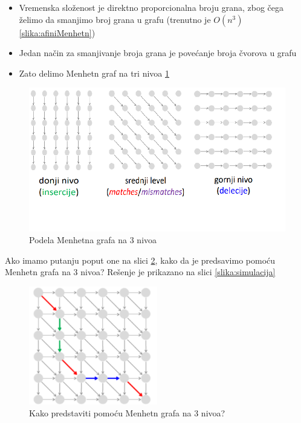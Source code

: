 \begin{itemize}
    \item Vremenska složenost je direktno proporcionalna broju grana, zbog čega želimo da smanjimo broj grana u grafu (trenutno je
$O(n^3)$ \ref{slika:afiniMenhetn})
\item Jedan način za smanjivanje broja grana je povećanje broja čvorova u grafu
\item Zato delimo Menhetn graf na tri nivoa \ref{slika:triNivoa}
\end{itemize}


\begin{figure}[]
\centering
\includegraphics[width=\textwidth]{poglavlja/5/slike/triNivoa.png}
\caption{Podela Menhetna grafa na 3 nivoa}
\label{slika:triNivoa}
\end{figure}

Ako imamo putanju poput one na slici \ref{slika:kakoSimulirati}, kako da je predsavimo pomoću Menhetn grafa na 3 nivoa? Rešenje je prikazano na slici \ref{slika:simulacija}


\begin{figure}[]
\centering
\includegraphics[width=0.5\textwidth]{poglavlja/5/slike/kakoSimulirari.png}
\caption{Kako predstaviti pomoću Menhetn grafa na 3 nivoa?}
\label{slika:kakoSimulirati}
\end{figure}


